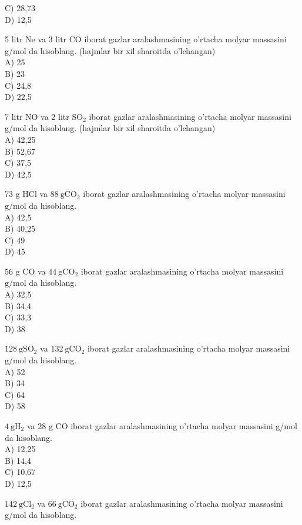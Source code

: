 C) 28,73\\
D) 12,5
  \item 5 litr Ne va 3 litr CO iborat gazlar aralashmasining o'rtacha molyar massasini g/mol da hisoblang. (hajmlar bir xil sharoitda o'lchangan)\\
A) 25\\
B) 23\\
C) 24,8\\
D) 22,5
  \item 7 litr NO va 2 litr $\mathrm{SO}_{2}$ iborat gazlar aralashmasining o'rtacha molyar massasini g/mol da hisoblang. (hajmlar bir xil sharoitda o'lchangan)\\
A) 42,25\\
B) 52,67\\
C) 37,5\\
D) 42,5
  \item 73 g HCl va $88 \mathrm{~g} \mathrm{CO}_{2}$ iborat gazlar aralashmasining o'rtacha molyar massasini $\mathrm{g} / \mathrm{mol}$ da hisoblang.\\
A) 42,5\\
B) 40,25\\
C) 49\\
D) 45
  \item 56 g CO va $44 \mathrm{~g} \mathrm{CO}_{2}$ iborat gazlar aralashmasining o'rtacha molyar massasini $\mathrm{g} / \mathrm{mol}$ da hisoblang.\\
A) 32,5\\
B) 34,4\\
C) 33,3\\
D) 38
  \item $128 \mathrm{~g} \mathrm{SO}_{2}$ va $132 \mathrm{~g} \mathrm{CO}_{2}$ iborat gazlar aralashmasining o'rtacha molyar massasini $\mathrm{g} / \mathrm{mol}$ da hisoblang.\\
A) 52\\
B) 34\\
C) 64\\
D) 58
  \item $4 \mathrm{~g} \mathrm{H}_{2}$ va 28 g CO iborat gazlar aralashmasining o'rtacha molyar massasini g/mol da hisoblang.\\
A) 12,25\\
B) 14,4\\
C) 10,67\\
D) 12,5
  \item $142 \mathrm{~g} \mathrm{Cl}_{2}$ va $66 \mathrm{~g} \mathrm{CO}_{2}$ iborat gazlar aralashmasining o'rtacha molyar massasini g/mol da hisoblang.\\
